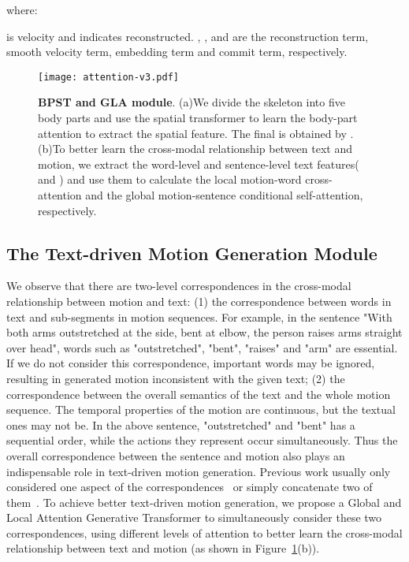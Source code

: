 \documentclass[10pt,twocolumn,letterpaper]{article}
\begin{document}
where:


 is velocity and  indicates reconstructed. , ,  and  are the reconstruction term, smooth velocity term, embedding term and commit term, respectively.

\begin{figure}[ht]
    \centering
    \texttt{[image: attention-v3.pdf]}
    \caption{\textbf{BPST and GLA module}. (a)We divide the skeleton into five body parts and use the spatial transformer to learn the body-part attention to extract the spatial feature. The final  is obtained by . (b)To better learn the cross-modal relationship between text and motion, we extract the word-level and sentence-level text features( and ) and use them to calculate the local motion-word cross-attention and the global motion-sentence conditional self-attention, respectively.}
    \label{img:03}
    \vspace{-10pt}
\end{figure}


\subsection{The Text-driven Motion Generation Module}
We observe that there are two-level correspondences in the cross-modal relationship between motion and text: (1) the correspondence between words in text and sub-segments in motion sequences. For example, in the sentence "With both arms outstretched at the side, bent at elbow, the person raises arms straight over head", words such as "outstretched", "bent", "raises" and "arm" are essential. If we do not consider this correspondence, important words may be ignored, resulting in generated motion inconsistent with the given text; (2) the correspondence between the overall semantics of the text and the whole motion sequence. The temporal properties of the motion are continuous, but the textual ones may not be. In the above sentence, "outstretched" and "bent" has a sequential order, while the actions they represent occur simultaneously. Thus the overall correspondence between the sentence and motion also plays an indispensable role in text-driven motion generation. Previous work usually only considered one aspect of the correspondences~\cite{zhang2022motiondiffuse,tevet2023human,petrovich2022temos,zhang2023t2m,chen2023mld} or simply concatenate two of them~\cite{guo2022generating}. To achieve better text-driven motion generation, we propose a Global and Local Attention Generative Transformer to simultaneously consider these two correspondences, using different levels of attention to better learn the cross-modal relationship between text and motion (as shown in Figure~\ref{img:03}(b)).
\end{document}

